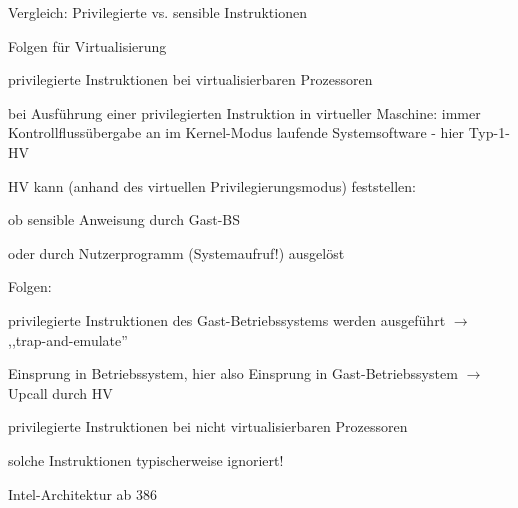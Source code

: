 \documentclass[a4paper]{article}
\begin{document}
\begin{multicols}{3}
    Vergleich: Privilegierte vs. sensible Instruktionen



    Folgen für Virtualisierung

    \begin{itemize*}
        \item
        privilegierte Instruktionen bei virtualisierbaren Prozessoren
        \item
        bei Ausführung einer privilegierten Instruktion in virtueller
        Maschine: immer Kontrollflussübergabe an im Kernel-Modus laufende
        Systemsoftware - hier Typ-1-HV
        \item
        HV kann (anhand des virtuellen Privilegierungsmodus) feststellen:
        \begin{enumerate*}

            \item ob sensible Anweisung durch Gast-BS
            \item oder durch Nutzerprogramm (Systemaufruf!) ausgelöst
        \end{enumerate*}
        \item
        Folgen:
        \begin{enumerate*}

            \item privilegierte Instruktionen des Gast-Betriebssystems werden ausgeführt $\rightarrow$ ,,trap-and-emulate''
            \item Einsprung in Betriebssystem, hier also Einsprung in Gast-Betriebssystem $\rightarrow$ Upcall durch HV
        \end{enumerate*}
        \item
        privilegierte Instruktionen bei nicht virtualisierbaren Prozessoren
        \begin{itemize*}
            \item solche Instruktionen typischerweise ignoriert!
        \end{itemize*}
    \end{itemize*}

    Intel-Architektur ab 386


\end{multicols}
\end{document}
